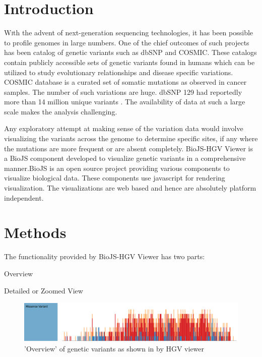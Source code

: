 \documentclass[twoside]{article}
\begin{document}
\begin{multicols}{2} %

\section{Introduction}

\lettrine[nindent=0em,lines=3]{W} 
ith the advent of next-generation sequencing technologies, it has been possible to profile genomes in large numbers. One of the chief outcomes of such projects has been catalog of genetic variants such as dbSNP\cite{Smigielski2000} and COSMIC\cite{Forbes2011}. These catalogs contain publicly accessible sets of genetic variants found in humans which can be utilized to  study evolutionary relationships and disease specific variations. COSMIC database is a curated set of somatic mutations as observed in cancer samples. The number of such variations are   huge. dbSNP 129 had reportedly more than 14 million unique variants \cite{ncbiweb}. The availability of data at such a large scale makes the analysis challenging.

Any exploratory attempt at making sense of the variation data would involve visualizing the variants across the genome to determine specific sites, if any where the mutations are more frequent or are absent completely. 
 BioJS-HGV Viewer is a BioJS \cite{Corpas2014} component developed to visualize genetic variants in a comprehensive manner.BioJS is an open source project providing various components to visualize biological data. These components use javascript for rendering visualization. The visualizations are web based and hence are absolutely platform independent.
 
 

\section{Methods}
The functionality provided by BioJS-HGV Viewer has two parts:\\
\begin{compactitem}
\item Overview
\item Detailed or Zoomed View
\end{compactitem}

\begin{figure}
\includegraphics[width=\linewidth]{openview0}
\caption{'Overview' of genetic variants as shown in by HGV viewer}
\end{figure}


\end{multicols}
\end{document}
